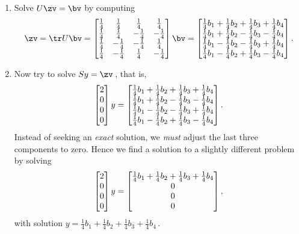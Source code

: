 \begin{reduce}
\begin{example}
\begin{enumerate}
\item Solve \(U\zv=\bv\) by computing 
\begin{equation*}
\zv=\tr U\bv
=\begin{bmatrix} 
  \h&\h&\h&\h
\\\h&\h&-\h&-\h
\\\h&-\h&-\h&\h
\\\h&-\h&\h&-\h \end{bmatrix}\bv
=\begin{bmatrix} \h b_1+\h b_2+\h b_3+\h b_4
\\\h b_1+\h b_2-\h b_3-\h b_4
\\\h b_1-\h b_2-\h b_3+\h b_4
\\\h b_1-\h b_2+\h b_3-\h b_4 \end{bmatrix}.
\end{equation*}

\item  Now try to solve \(Sy=\zv\)\,, that is,
\begin{equation*}
\begin{bmatrix} 2\\0\\0\\0 \end{bmatrix}y
=\begin{bmatrix} \h b_1+\h b_2+\h b_3+\h b_4
\\\h b_1+\h b_2-\h b_3-\h b_4
\\\h b_1-\h b_2-\h b_3+\h b_4
\\\h b_1-\h b_2+\h b_3-\h b_4 \end{bmatrix}.
\end{equation*}
Instead of seeking an \emph{exact} solution,  we \emph{must} adjust the last three components to zero. 
Hence we find a solution to a slightly different problem by solving
\begin{equation*}
\begin{bmatrix} 2\\0\\0\\0 \end{bmatrix}y
=\begin{bmatrix} \h b_1+\h b_2+\h b_3+\h b_4\\0\\0\\0 \end{bmatrix},
\end{equation*}
\def\h{\frac14}%
with solution \(y=\h b_1+\h b_2+\h b_3+\h b_4\)\,.


\end{enumerate}
\end{example}
\end{reduce}
